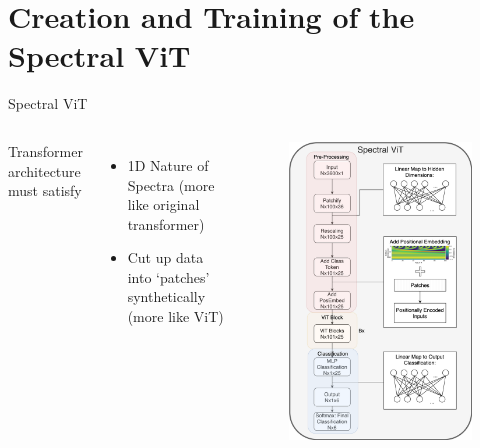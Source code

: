 \section[Spectral ViT]{Creation and Training of the Spectral ViT}
\begin{frame}{Spectral ViT}
\begin{columns}[c]
Transformer architecture must satisfy 
    \begin{itemize}
        \item 1D Nature of Spectra (more like original transformer)
        \item Cut up data into `patches' synthetically (more like ViT)
    \end{itemize}
    \begin{figure}
        \centering
        \includegraphics[width=.8\textwidth]{figures/TransformerDiagrams/SpectralViT_Presentation.png}
    \end{figure}
\end{columns}
\end{frame}

